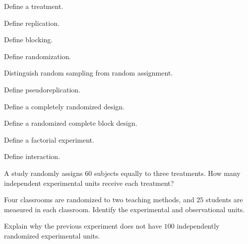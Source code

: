 \begin{exercise}[1]
Define a treatment.
\end{exercise}

\begin{exercise}[1]
Define replication.
\end{exercise}

\begin{exercise}[1]
Define blocking.
\end{exercise}

\begin{exercise}[1]
Define randomization.
\end{exercise}

\begin{exercise}[1]
Distinguish random sampling from random assignment.
\end{exercise}

\begin{exercise}[1]
Define pseudoreplication.
\end{exercise}

\begin{exercise}[1]
Define a completely randomized design.
\end{exercise}

\begin{exercise}[1]
Define a randomized complete block design.
\end{exercise}

\begin{exercise}[1]
Define a factorial experiment.
\end{exercise}

\begin{exercise}[1]
Define interaction.
\end{exercise}

\begin{exercise}[2]
A study randomly assigns \(60\) subjects equally to three treatments.
How many independent experimental units receive each treatment?
\end{exercise}

\begin{exercise}[2]
Four classrooms are randomized to two teaching methods, and \(25\)
students are measured in each classroom. Identify the experimental and
observational units.
\end{exercise}

\begin{exercise}[2]
Explain why the previous experiment does not have \(100\) independently
randomized experimental units.
\end{exercise}

